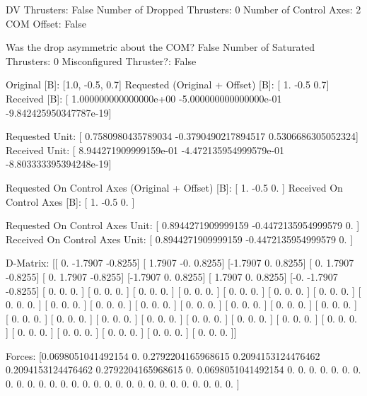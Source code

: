 DV Thrusters:	False
Number of Dropped Thrusters:	0
Number of Control Axes:	2
COM Offset:	False

Was the drop asymmetric about the COM?	False
Number of Saturated Thrusters:	0
Misconfigured Thruster?:	False

Original [B]:	[1.0, -0.5, 0.7]
Requested (Original + Offset) [B]:	[ 1.  -0.5  0.7]
Received [B]:		[ 1.000000000000000e+00 -5.000000000000000e-01 -9.842425950347787e-19]

Requested Unit:		[ 0.7580980435789034 -0.3790490217894517  0.5306686305052324]
Received Unit:		[ 8.944271909999159e-01 -4.472135954999579e-01 -8.803333395394248e-19]

Requested On Control Axes (Original + Offset) [B]:	[ 1.  -0.5  0. ]
Received On Control Axes [B]:		[ 1.  -0.5  0. ]

Requested On Control Axes Unit:		[ 0.8944271909999159 -0.4472135954999579  0.                ]
Received On Control Axes Unit:		[ 0.8944271909999159 -0.4472135954999579  0.                ]

D-Matrix:
[[ 0.     -1.7907 -0.8255]
 [ 1.7907 -0.      0.8255]
 [-1.7907  0.      0.8255]
 [ 0.      1.7907 -0.8255]
 [ 0.      1.7907 -0.8255]
 [-1.7907  0.      0.8255]
 [ 1.7907  0.      0.8255]
 [-0.     -1.7907 -0.8255]
 [ 0.      0.      0.    ]
 [ 0.      0.      0.    ]
 [ 0.      0.      0.    ]
 [ 0.      0.      0.    ]
 [ 0.      0.      0.    ]
 [ 0.      0.      0.    ]
 [ 0.      0.      0.    ]
 [ 0.      0.      0.    ]
 [ 0.      0.      0.    ]
 [ 0.      0.      0.    ]
 [ 0.      0.      0.    ]
 [ 0.      0.      0.    ]
 [ 0.      0.      0.    ]
 [ 0.      0.      0.    ]
 [ 0.      0.      0.    ]
 [ 0.      0.      0.    ]
 [ 0.      0.      0.    ]
 [ 0.      0.      0.    ]
 [ 0.      0.      0.    ]
 [ 0.      0.      0.    ]
 [ 0.      0.      0.    ]
 [ 0.      0.      0.    ]
 [ 0.      0.      0.    ]
 [ 0.      0.      0.    ]
 [ 0.      0.      0.    ]
 [ 0.      0.      0.    ]
 [ 0.      0.      0.    ]
 [ 0.      0.      0.    ]]

Forces:
[0.0698051041492154 0.                 0.2792204165968615
 0.2094153124476462 0.2094153124476462 0.2792204165968615
 0.                 0.0698051041492154 0.
 0.                 0.                 0.
 0.                 0.                 0.
 0.                 0.                 0.
 0.                 0.                 0.
 0.                 0.                 0.
 0.                 0.                 0.
 0.                 0.                 0.
 0.                 0.                 0.
 0.                 0.                 0.                ]

